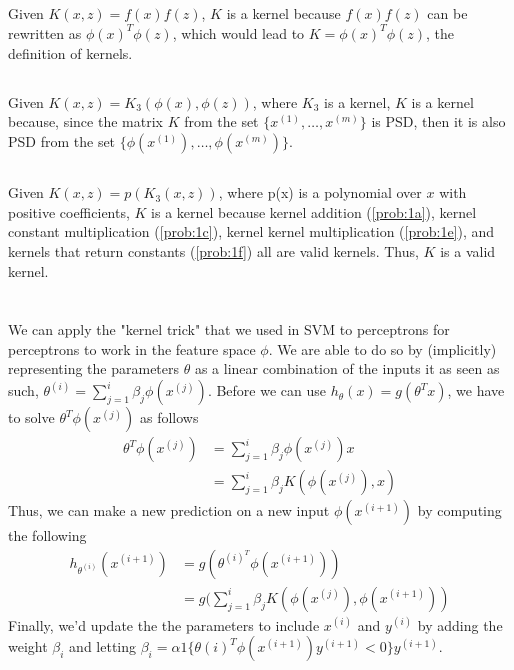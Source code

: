 \documentclass[11pt,a4paper,titlepage]{article}
\begin{document}
{\subsection{}{
\quad Given $K(x, z) = f(x)f(z)$, $K$ is a kernel because $f(x)f(z)$ can be rewritten as $\phi(x)^T\phi(z)$, which would lead to $K=\phi(x)^T\phi(z)$, the definition of kernels.
}\label{prob:1f}
\subsection{}{
\quad Given $K(x, z) = K_3(\phi(x), \phi(z))$, where $K_3$ is a kernel, $K$ is a kernel because, since the matrix $K$ from the set $\{x^{(1)},\ldots,x^{(m)}\}$ is PSD, then it is also PSD from the set $\{\phi(x^{(1)}),\ldots,\phi(x^{(m)})\}$.
}\label{prob:1g}
\subsection{}{
\quad Given $K(x, z) = p(K_3(x,z))$, where p(x) is a polynomial over $x$ with positive coefficients, $K$ is a kernel because kernel addition (\ref{prob:1a}), kernel constant multiplication (\ref{prob:1c}), kernel kernel multiplication (\ref{prob:1e}), and kernels that return constants (\ref{prob:1f}) all are valid kernels. Thus, $K$ is a valid kernel.
}\label{prob:1h}
}\label{problem 1}
\section{}{
\quad We can apply the "kernel trick" that we used in SVM to perceptrons for perceptrons to work in the feature space $\phi$. We are able to do so by (implicitly) representing the parameters $\theta$ as a linear combination of the inputs it as seen as such, $\theta^{(i)} = \sum_{j=1}^i \beta_j \phi(x^{(j)})$. Before we can use $h_\theta(x) = g(\theta^Tx)$, we have to solve $\theta^T\phi(x^{(j)})$ as follows
\begin{align*}
	\theta^T\phi(x^{(j)}) &= \sum_{j=1}^i \beta_j \phi(x^{(j)}) x
    \\ &= \sum_{j=1}^i \beta_j K(\phi(x^{(j)}), x)
\end{align*}
Thus, we can make a new prediction on a new input $\phi(x^{(i+1)})$ by computing the following
\begin{align*}
	h_{\theta^{(i)}}(x^{(i+1)}) &= g(\theta^{{(i)}^T} \phi(x^{(i+1)}))
    \\ &= g(\sum_{j=1}^{i} \beta_j K(\phi(x^{(j)}), \phi(x^{(i+1)}))
\end{align*}
Finally, we'd update the the parameters to include $x^{(i)}$ and $y^{(i)}$ by adding the weight $\beta_i$ and letting $\beta_i = \alpha 1\{\theta{(i)^T}\phi(x^{(i+1)})y^{(i+1)}<0\} y^{(i+1)}$.
}\label{problem 2}
\end{document}
